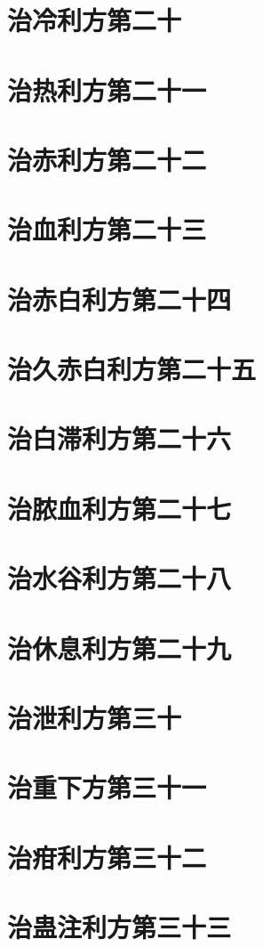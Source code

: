 \documentclass[a4paper,12pt,UTF8,twoside]{ctexbook}
\begin{document}
\chapter{治冷利方第二十}
\chapter{治热利方第二十一}
\chapter{治赤利方第二十二}
\chapter{治血利方第二十三}
\chapter{治赤白利方第二十四}
\chapter{治久赤白利方第二十五}
\chapter{治白滞利方第二十六}
\chapter{治脓血利方第二十七}
\chapter{治水谷利方第二十八}
\chapter{治休息利方第二十九}
\chapter{治泄利方第三十}
\chapter{治重下方第三十一}
\chapter{治疳利方第三十二}
\chapter{治蛊注利方第三十三}
\end{document}
